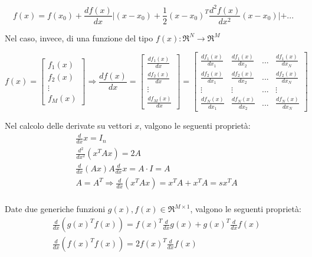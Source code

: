   \[ f(x)=f(x_0)+{\frac{df(x)}{dx}}\lvert(x-x_0) + {\frac{1}{2}(x-x_0)^T\frac{d^2f(x)}{dx^2}(x-x_0)}\lvert + ... \]

\noindent Nel caso, invece, di una funzione del tipo $f(x):\Re^N \rightarrow \Re^M$

  \[ f(x)=\begin{bmatrix}f_1(x) \\ f_2(x) \\ \vdots \\ f_M(x)\end{bmatrix}  \Longrightarrow \frac{df(x)}{dx}=\begin{bmatrix}\frac{df_1(x)}{dx}\\ \frac{df_2(x)}{dx}\\ \vdots \\ \frac{df_M(x)}{dx} \end{bmatrix}=\begin{bmatrix}\frac{df_1(x)}{dx_1} & \frac{df_1(x)}{dx_2} & ... & \frac{df_1(x)}{dx_N} \\ \frac{df_2(x)}{dx_1} & \frac{df_2(x)}{dx_2} & ... & \frac{df_2(x)}{dx_N}  \\ \vdots & \vdots & ... & \vdots \\ \frac{df_N(x)}{dx_1} & \frac{df_N(x)}{dx_2} & ... & \frac{df_N(x)}{dx_N}\end{bmatrix} \]

\noindent Nel calcolo delle derivate su vettori $x$, valgono le seguenti proprietà:
  \begin{align*}
    &\frac{d}{dx}x=I_n \\
    &\frac{d^2}{dx^2}(x^TAx)=2A \\
    &\frac{d}{dx}(Ax)A\frac{d}{dx}x=A\cdot I=A\\
    &A=A^T \Longrightarrow \frac{d}{dx}(x^TAx)=x^TA+x^TA=sx^TA\\
  \end{align*}

\noindent Date due generiche funzioni $g(x),f(x) \in \Re^{M \times 1}$, valgono le seguenti proprietà:
  \begin{align*}
    &\frac{d}{dx}(g(x)^Tf(x))=f(x)^T\frac{d}{dx}g(x)+g(x)^T\frac{d}{dx}f(x)\\
    &\frac{d}{dx}(f(x)^Tf(x))=2f(x)^T\frac{d}{dx}f(x)
  \end{align*}
